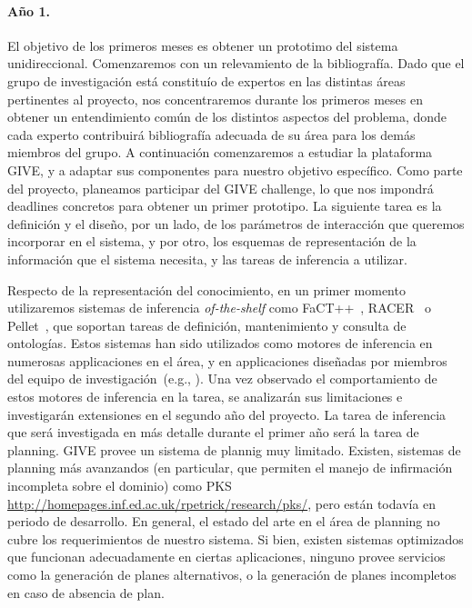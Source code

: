 \paragraph{A\~no 1.} El objetivo de los primeros meses es obtener un
prototimo del sistema unidireccional.  Comenzaremos con un relevamiento
de la bibliograf\'ia.  Dado que el grupo de investigaci\'on est\'a
constitu\'io de expertos en las distintas \'areas pertinentes al
proyecto, nos concentraremos durante los primeros meses en obtener un
entendimiento com\'un de los distintos aspectos del problema, donde
cada experto contribuir\'a bibliograf\'ia adecuada de su \'area para los
dem\'as miembros del grupo.  A continuaci\'on comenzaremos a estudiar
la plataforma GIVE, y a adaptar sus componentes para nuestro objetivo
espec\'ifico.  Como parte del proyecto, planeamos participar del GIVE
challenge, lo que nos impondr\'a deadlines concretos para obtener un
primer prototipo.  La siguiente tarea es la definici\'on  y el dise\~no,
por un lado, de los par\'ametros de interacci\'on que queremos incorporar
en el sistema, y por otro, los esquemas de representaci\'on de la
informaci\'on que el sistema necesita, y las tareas de inferencia a
utilizar.


Respecto de la representaci\'on del conocimiento, en un primer momento
utilizaremos sistemas de inferencia \emph{of-the-shelf} como
FaCT++~\citep{horr:fact99},
RACER~\citep{haar:race99} o Pellet~\citep{XXX}, que soportan tareas de
definici\'on, mantenimiento y consulta de ontolog\'ias.  Estos sistemas
han sido utilizados como motores de inferencia
en numerosas applicaciones en el \'area, y en applicaciones
dise\~nadas por miembros del equipo de
investigaci\'on~(e.g., \citep{FROLOG}).  Una vez observado el comportamiento de
estos motores de inferencia en la tarea, se analizar\'an sus limitaciones
e investigar\'an extensiones en el segundo a\~no del proyecto.  La tarea
de inferencia que ser\'a investigada en m\'as detalle durante el primer
a\~no ser\'a la tarea de planning.  GIVE provee un sistema de plannig muy
limitado.  Existen, sistemas de planning m\'as avanzandos (en particular,
que permiten el manejo de infirmaci\'on incompleta sobre el dominio)
como PKS \url{http://homepages.inf.ed.ac.uk/rpetrick/research/pks/}, pero
est\'an todav\'ia en periodo de desarrollo.  En general, el estado del
arte en el \'area de planning no cubre los requerimientos de nuestro
sistema.  Si bien, existen sistemas optimizados que funcionan adecuadamente
en ciertas aplicaciones, ninguno provee servicios como la generaci\'on de
planes alternativos, o la generaci\'on de planes incompletos en caso de
absencia de plan.

